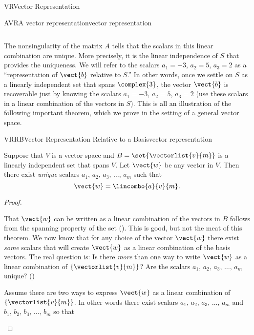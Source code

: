 \begin{subsect}{VR}{Vector Representation}
\begin{example}{AVR}{A vector representation}{vector representation}
\begin{para}
\begin{equation*}
\end{equation*}
\end{para}
%
\begin{para}The nonsingularity of the matrix $A$ tells that the scalars in this linear combination are unique.  More precisely, it is the linear independence of $S$ that provides the uniqueness.  We will refer to the scalars $a_1=-3$, $a_2=5$, $a_3=2$ as a ``representation of $\vect{b}$ relative to $S$.''  In other words, once we settle on $S$ as a linearly independent set that spans $\complex{3}$, the vector $\vect{b}$ is recoverable just by knowing the scalars $a_1=-3$, $a_2=5$, $a_3=2$ (use these scalars in a linear combination of the vectors in $S$).   This is all an illustration of the following important theorem, which we prove in the setting of a general vector space.\end{para}
%
\end{example}
%
\begin{theorem}{VRRB}{Vector Representation Relative to a Basis}{vector representation}
\begin{para}Suppose that $V$ is a vector space and $B=\set{\vectorlist{v}{m}}$ is a linearly independent set that spans $V$.  Let $\vect{w}$ be any vector in $V$.  Then there exist {\em unique} scalars $a_1,\,a_2,\,a_3,\,\ldots,\,a_m$ such that
%
\begin{equation*}
\vect{w}=\lincombo{a}{v}{m}.
\end{equation*}
\end{para}
%
\end{theorem}
%
\begin{proof}
\begin{para}That $\vect{w}$ can be written as a linear combination of the vectors in $B$ follows from the spanning property of the set ().  This is good, but not the meat of this theorem.  We now know that for any choice of the vector $\vect{w}$ there exist {\em some} scalars that will create $\vect{w}$ as a linear combination of the basis vectors.  The real question is:  Is there {\em more} than one way to write $\vect{w}$ as a linear combination of $\{\vectorlist{v}{m}\}$?  Are the scalars $a_1,\,a_2,\,a_3,\,\ldots,\,a_m$ unique?  ()\end{para}
%
\begin{para}Assume there are two ways to express $\vect{w}$ as a linear combination of $\{\vectorlist{v}{m}\}$.  In other words there exist scalars $a_1,\,a_2,\,a_3,\,\ldots,\,a_m$ and $b_1,\,b_2,\,b_3,\,\ldots,\,b_m$ so that

\end{para}
\end{proof}
\end{subsect}
